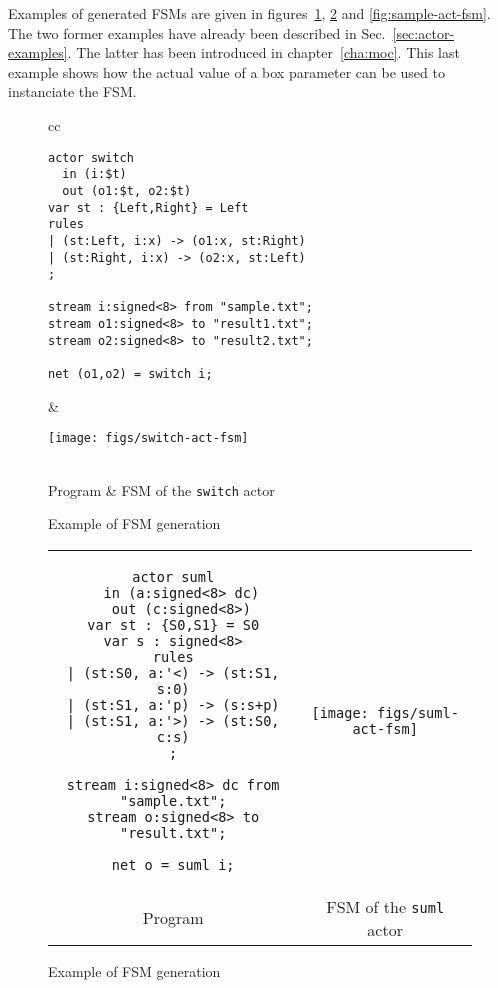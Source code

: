\medskip
Examples of generated FSMs are given in figures~\ref{fig:switch-act-fsm}, \ref{fig:suml-act-fsm} and
\ref{fig:sample-act-fsm}. The two former examples have already been described in
Sec.~\ref{sec:actor-examples}. The latter has been introduced in chapter~\ref{cha:moc}. This last
example shows how the actual value of a box parameter can be used to instanciate the FSM.

\begin{figure}[h]
\begin{tabular}[c]{cc}
  \begin{minipage}[b]{0.5\linewidth}
    \begin{lstlisting}
actor switch
  in (i:$t)
  out (o1:$t, o2:$t)
var st : {Left,Right} = Left
rules
| (st:Left, i:x) -> (o1:x, st:Right)
| (st:Right, i:x) -> (o2:x, st:Left)
;

stream i:signed<8> from "sample.txt";
stream o1:signed<8> to "result1.txt";
stream o2:signed<8> to "result2.txt";

net (o1,o2) = switch i;
    \end{lstlisting} 
  \end{minipage} &
  \begin{minipage}[b]{0.5\linewidth}
  \texttt{[image: figs/switch-act-fsm]}
  \end{minipage} \\
Program & FSM of the \texttt{switch} actor
\end{tabular}
  \caption{Example of FSM generation}
  \label{fig:switch-act-fsm}
\end{figure}

\begin{figure}[h]
\begin{tabular}[c]{cc}
  \begin{minipage}[b]{0.5\linewidth}
    \begin{lstlisting}
actor suml
  in (a:signed<8> dc)
  out (c:signed<8>)
var st : {S0,S1} = S0
var s : signed<8>
rules
| (st:S0, a:'<) -> (st:S1, s:0)
| (st:S1, a:'p) -> (s:s+p)
| (st:S1, a:'>) -> (st:S0, c:s)
;

stream i:signed<8> dc from "sample.txt";
stream o:signed<8> to "result.txt";

net o = suml i;
    \end{lstlisting} 
  \end{minipage} &
  \begin{minipage}[b]{0.5\linewidth}
  \texttt{[image: figs/suml-act-fsm]}
  \end{minipage} \\
Program & FSM of the \texttt{suml} actor
\end{tabular}
  \caption{Example of FSM generation}
  \label{fig:suml-act-fsm}
\end{figure}

